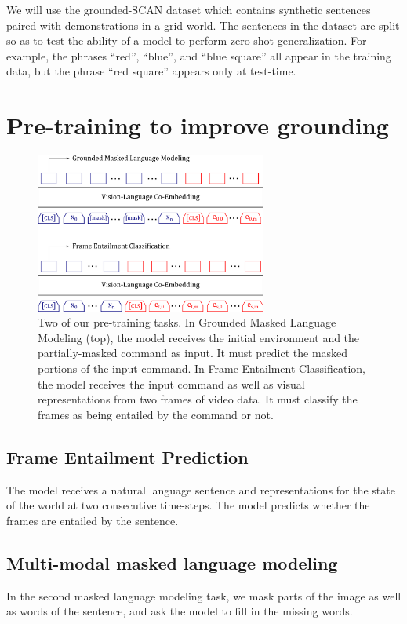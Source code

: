 \documentclass[11pt]{article}
\begin{document}
We will use the grounded-SCAN dataset \cite{ruis2020benchmark} which contains synthetic sentences paired with demonstrations in a grid world.
%
The sentences in the dataset are split so as to test the ability of a model to perform zero-shot generalization.
%
For example, the phrases ``red'', ``blue'', and ``blue square'' all appear in the training data, but the phrase ``red square'' appears only at test-time.

\section{Pre-training to improve grounding}
\begin{figure}
	\includegraphics[width=3in]{pre_training_model.png}
	\caption{Two of our pre-training tasks. 
	In Grounded Masked Language Modeling (top), the model receives the initial environment and the partially-masked command as input.
	It must predict the masked portions of the input command.
	In Frame Entailment Classification, the model receives the input command as well as visual representations from two frames of video data. 
	It must classify the frames as being entailed by the command or not.
}
	\label{fig:pre_training}	
\end{figure}

\subsection*{Frame Entailment Prediction}
%
The model receives a natural language sentence and representations for the state of the world at two consecutive time-steps.
%
The model predicts whether the frames are entailed by the sentence.

\subsection{Multi-modal masked language modeling}
%
In the second masked language modeling task, we mask parts of the image as well as words of the sentence, and ask the model to fill in the missing words.
\end{document}
